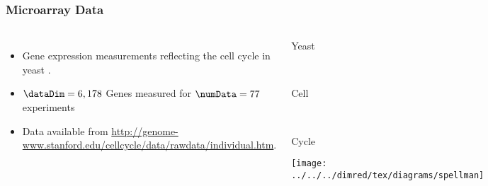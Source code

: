 \begin{frame}
  \frametitle{Microarray Data}
  \begin{columns}
    \begin{itemize}
    \item Gene expression measurements reflecting the cell cycle in yeast {\footnotesize \citep{Spellman:yeastcellcy98}}. 
    \item $\dataDim=6,178$ Genes measured for $\numData=77$ experiments
    \item Data available from \url{http://genome-www.stanford.edu/cellcycle/data/rawdata/individual.htm}.
    \end{itemize}


    \begin{center}
      \begin{minipage}[b][0.8\textheight][t]{0.5\columnwidth}%
        \begin{minipage}[c][0.3\textheight]{1\columnwidth}%
          \begin{center}
            Yeast
          \end{center}%
        \end{minipage}\\
        \begin{minipage}[c][0.3\textheight]{1\columnwidth}%
          \begin{center}
            Cell
          \end{center}%
        \end{minipage}\\
        \begin{minipage}[c][0.3\textheight]{1\columnwidth}%
          \begin{center}
            Cycle
          \end{center}
        \end{minipage}
      \end{minipage}\texttt{[image: ../../../dimred/tex/diagrams/spellman]}
    \end{center}
    
  \end{columns}
  
\end{frame}

